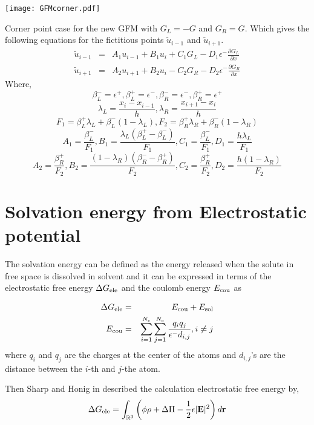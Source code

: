 \begin{center}
	\texttt{[image: GFMcorner.pdf]}\\		
\end{center}
		
Corner point case for the new GFM with $G_L=-G$ and $G_R = G$. 
Which gives the following equations for the fictitious points $\tilde{u}_{i-1}$ and $\tilde{u}_{i+1}$. 
	\begin{eqnarray}
		\tilde{u}_{i-1}&=& A_1 u_{i-1}+B_1 u_{i} + C_1 G_L- D_1 \epsilon^- \frac{\partial G_L}{\partial x} \\
		\tilde{u}_{i+1}&=& A_2 u_{i+1}+B_2 u_{i} - C_2 G_R- D_2 \epsilon^- \frac{\partial G_R}{\partial x}
	\end{eqnarray}
	Where,
	$$\beta_L^-=\epsilon^+,\beta_L^+=\epsilon^-,\beta_R^-=\epsilon^-,\beta_R^+=\epsilon^+$$
	$$\lambda_L=\frac{x_i-x_{i-1}}{h},\lambda_R=\frac{x_{i+1}-x_i}{h}$$
	$$F_1 = \beta^+_L \lambda_L+\beta^-_L(1-\lambda_L), F_2 = \beta^+_R \lambda_R+\beta^-_R(1-\lambda_R)$$
	$$	A_1 = \frac{\beta^-_L}{F_1}, B_1  = \frac{\lambda_L(\beta^+_L-\beta^-_L)}{F_1}, C_1 = \frac{\beta^-_L}{F_1},D_1 = \frac{h \lambda_L}{F_1} $$ %
	$$A_2 = \frac{\beta^+_R}{F_2}, B_2  = \frac{(1-\lambda_R)(\beta^-_R-\beta^+_R)}{F_2}, C_2 = \frac{\beta^+_R}{F_2},D_2 = \frac{h(1- \lambda_R)}{F_2}$$
\section{Solvation energy from Electrostatic potential}

The solvation energy can be defined as the energy released when the solute in free space is dissolved in solvent and it can be expressed in terms of the electrostatic free energy $\Delta G_{\rm ele}$ and the coulomb energy $E_{\rm cou}$ as 

\begin{eqnarray}
	\Delta G_{\rm ele}&=& E_{\rm cou}+ E_{\rm sol}\label{eq_Gele}\\
	E_{\rm cou} &=& \sum_{i=1}^{N_c}\sum_{j=1}^{N_c}\frac{q_iq_j}{\epsilon^-d_{i,j}}, i\neq j\label{eq_Ecou}
\end{eqnarray}
where $q_i$ and $q_j$ are the charges at the center of the atoms and $d_{i,j}$'s are the distance between the $i$-th and $j$-the atom. 
  
Then Sharp and Honig in \cite{Sharp_Honig}  described the calculation electrostatic free energy by, 
\begin{equation}
\Delta G_{\rm ele}=\int_{\mathbb{R}^3}\left(\phi\rho+\Delta\Pi-\frac{1}{2}\epsilon|{\bf E}|^2\right)d{\bf r}
\end{equation}

